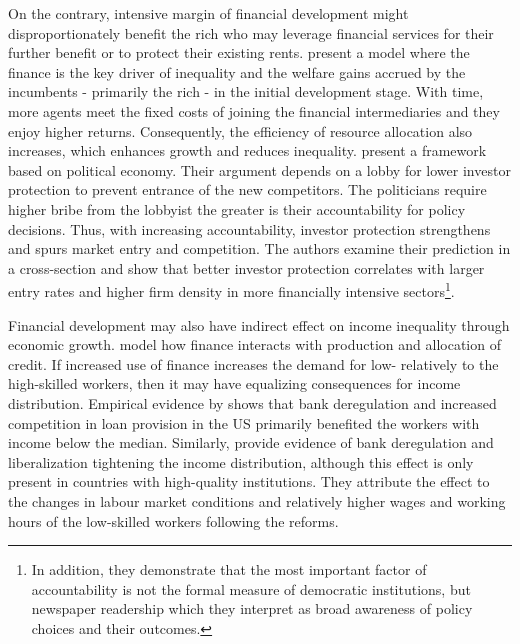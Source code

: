 \begin{refsection}
On the contrary, intensive margin of financial development might disproportionately benefit the rich who may leverage financial services for their further benefit or to protect their existing rents. \textcite{GreenwoodJovanovic1990} present a model where the finance is the key driver of inequality and the welfare gains accrued by the incumbents - primarily the rich - in the initial development stage. With time, more agents meet the fixed costs of joining the financial intermediaries and they enjoy higher returns. Consequently, the efficiency of resource allocation also increases, which enhances growth and reduces inequality. \textcite{perotti2007investor} present a framework based on political economy. Their argument depends on a lobby for lower investor protection to prevent entrance of the new competitors. The politicians require higher bribe from the lobbyist the greater is their accountability for policy decisions. Thus, with increasing accountability, investor protection strengthens and spurs market entry and competition. The authors examine their prediction in a cross-section and show that better investor protection correlates with larger entry rates and higher firm density in more financially intensive sectors\footnote{In addition, they demonstrate that the most important factor of accountability is not the formal measure of democratic institutions, but newspaper readership which they interpret as broad awareness of policy choices and their outcomes.}. 

Financial development may also have indirect effect on income inequality through economic growth. \textcite{townsendeueda2006} model how finance interacts with production and allocation of credit. If increased use of finance increases the demand for low- relatively to the high-skilled workers, then it may have equalizing consequences for income distribution. Empirical evidence by \textcite{beck2010big} shows that bank deregulation and increased competition in loan provision in the \ac{US} primarily benefited the workers with income below the median. Similarly, \textcite{delis2014} provide evidence of bank deregulation and liberalization tightening the income distribution, although this effect is only present in countries with high-quality institutions. They attribute the effect to the changes in labour market conditions and relatively higher wages and working hours of the low-skilled workers following the reforms. 


\end{refsection}
